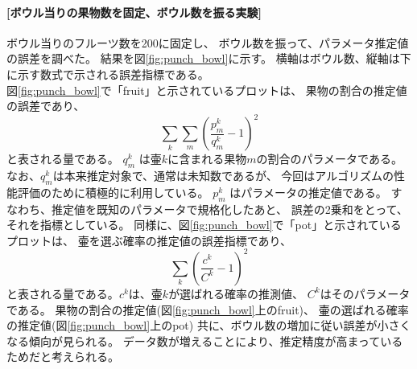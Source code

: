 \documentclass[a4j]{jarticle}
\begin{document}
\paragraph{[ボウル当りの果物数を固定、ボウル数を振る実験]}
ボウル当りのフルーツ数を200に固定し、
ボウル数を振って、パラメータ推定値の誤差を調べた。
結果を図\ref{fig:punch_bowl}に示す。
横軸はボウル数、縦軸は下に示す数式で示される誤差指標である。 \\
図\ref{fig:punch_bowl}で「fruit」と示されているプロットは、
果物の割合の推定値の誤差であり、
\begin{equation}
\label{err_fruit}
\sum_{k} \sum_{m} (\frac{p_m^k}{q_m^k} - 1)^2
\end{equation}
と表される量である。
$q_m^k$ は壷$k$に含まれる果物$m$の割合のパラメータである。
なお、$q_m^k$は本来推定対象で、通常は未知数であるが、
今回はアルゴリズムの性能評価のために積極的に利用している。
$p_m^k$ はパラメータの推定値である。
すなわち、推定値を既知のパラメータで規格化したあと、
誤差の2乗和をとって、それを指標としている。
同様に、図\ref{fig:punch_bowl}で「pot」と示されているプロットは、
壷を選ぶ確率の推定値の誤差指標であり、
\begin{equation}
\label{err_pot}
\sum_{k} (\frac{c^k}{C^k} - 1)^2
\end{equation}
と表される量である。$c^k$は、壷$k$が選ばれる確率の推測値、
$C^k$はそのパラメータである。
果物の割合の推定値(図\ref{fig:punch_bowl}上のfruit)、
壷の選ばれる確率の推定値(図\ref{fig:punch_bowl}上のpot)
共に、ボウル数の増加に従い誤差が小さくなる傾向が見られる。
データ数が増えることにより、推定精度が高まっているためだと考えられる。
\end{document}
